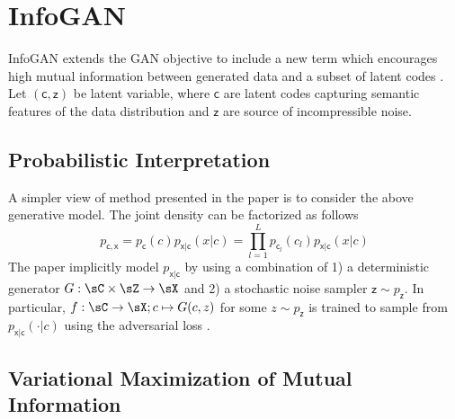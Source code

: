 \documentclass[11pt]{article}
\newcommand\rx{\ensuremath{\mathsf{x}}}
\newcommand\rc{\ensuremath{\mathsf{c}}}
\newcommand\rz{\ensuremath{\mathsf{z}}}
\begin{document}
\section{InfoGAN}

InfoGAN extends the GAN objective to include a new term which encourages high mutual information between generated data and a subset of latent codes \cite{chenInfoGANInterpretableRepresentation2016}. Let $(\rc,\rz)$ be latent variable, where $\rc$ are latent codes capturing semantic features of the data distribution and $\rz$ are source of incompressible noise.

\subsection{Probabilistic Interpretation}

A simpler view of method presented in the paper is to consider the above generative model. The joint density can be factorized as follows
\[
    p_{\rc,\rx} = p_{\rc}(c) p_{\rx|\rc}(x|c) = \prod_{l=1}^L p_{\rc_l}(c_l) p_{\rx|\rc}(x|c)
\]
The paper implicitly model $p_{\rx|\rc}$ by using a combination of 1) a deterministic generator $G:\sC\times\sZ\to\sX$ and 2) a stochastic noise sampler $\rz \sim p_{\rz}$. In particular, $f:\sC\to \sX; c \mapsto G(c,z)$ for some $z\sim p_{\rz}$ is trained to sample from $p_{\rx|\rc}(\cdot|c)$ using the adversarial loss \cite{goodfellowGenerativeAdversarialNetworks2014}.

\subsection{Variational Maximization of Mutual Information}
\end{document}
